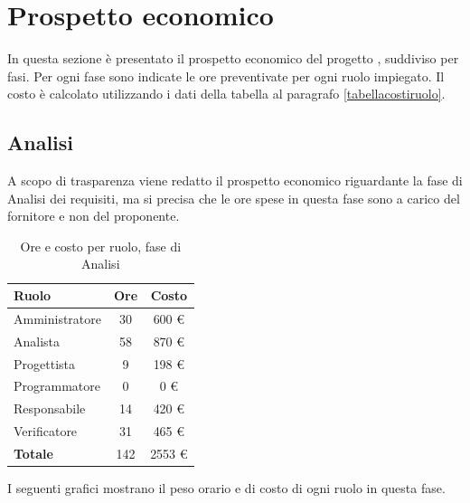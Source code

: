 
\section{Prospetto economico}

In questa sezione è presentato il prospetto economico del progetto \ProjectName{}, suddiviso per fasi. Per ogni fase sono indicate le ore preventivate per ogni ruolo impiegato.
Il costo è calcolato utilizzando i dati della tabella al paragrafo \ref{tabellacostiruolo}.

\subsection{Analisi}

A scopo di trasparenza viene redatto il prospetto economico riguardante la fase di Analisi dei requisiti, ma si precisa che le ore spese in questa fase sono a carico del fornitore e non del proponente.

\begin{table}[H]
	\centering
	\begin{tabular}{ l c c }
	\textbf{Ruolo} & \textbf{Ore} & \textbf{Costo} \\
	\hline
	Amministratore & 30 & 600 €\\
	Analista & 58 & 870 €\\
	Progettista & 9 & 198 €\\
	Programmatore & 0 & 0 €\\
	Responsabile & 14 & 420 €\\
	Verificatore & 31 & 465 €\\
	\hline
	\textbf{Totale} & 142 & 2553 €\\
	\hline
	\end{tabular}
	\caption{Ore e costo per ruolo, fase di Analisi}
	\end{table}

I seguenti grafici mostrano il peso orario e di costo di ogni ruolo in questa fase.

